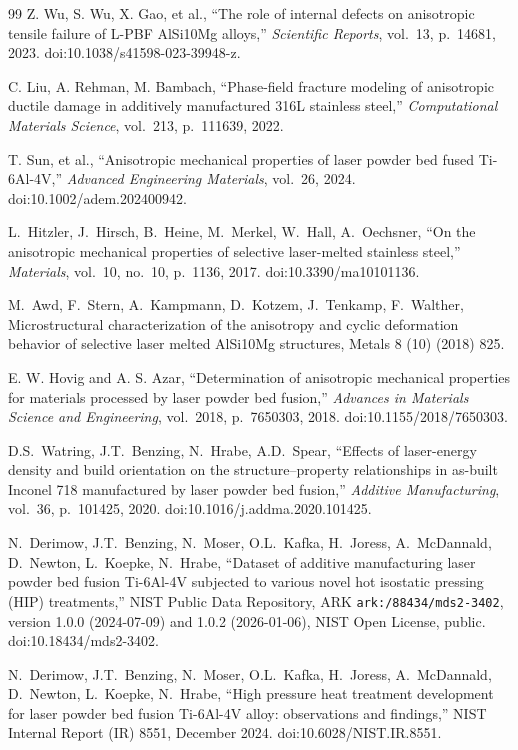 \documentclass[twocolumn]{sagej}
\begin{document}
\begin{thebibliography}{99}
Z. Wu, S. Wu, X. Gao, et al., ``The role of internal defects on anisotropic tensile failure of L-PBF AlSi10Mg alloys,'' \textit{Scientific Reports}, vol.~13, p.~14681, 2023. doi:10.1038/s41598-023-39948-z.

C. Liu, A. Rehman, M. Bambach, ``Phase-field fracture modeling of anisotropic ductile damage in additively manufactured 316L stainless steel,'' \textit{Computational Materials Science}, vol.~213, p.~111639, 2022.

T. Sun, et al., ``Anisotropic mechanical properties of laser powder bed fused Ti-6Al-4V,'' \textit{Advanced Engineering Materials}, vol.~26, 2024. doi:10.1002/adem.202400942.

L.~Hitzler, J.~Hirsch, B.~Heine, M.~Merkel, W.~Hall, A.~Oechsner, ``On the anisotropic mechanical properties of selective laser-melted stainless steel,'' \textit{Materials}, vol.~10, no.~10, p.~1136, 2017. doi:10.3390/ma10101136.

M.~Awd, F.~Stern, A.~Kampmann, D.~Kotzem, J.~Tenkamp, F.~Walther, Microstructural characterization of the anisotropy and cyclic deformation behavior of selective laser melted AlSi10Mg structures, Metals 8 (10) (2018) 825.

E. W. Hovig and A. S. Azar, ``Determination of anisotropic mechanical properties for materials processed by laser powder bed fusion,'' \textit{Advances in Materials Science and Engineering}, vol.~2018, p.~7650303, 2018. doi:10.1155/2018/7650303.

D.S.~Watring, J.T.~Benzing, N.~Hrabe, A.D.~Spear, ``Effects of laser-energy density and build orientation on the structure--property relationships in as-built Inconel 718 manufactured by laser powder bed fusion,'' \textit{Additive Manufacturing}, vol.~36, p.~101425, 2020. doi:10.1016/j.addma.2020.101425.

N.~Derimow, J.T.~Benzing, N.~Moser, O.L.~Kafka, H.~Joress, A.~McDannald, D.~Newton, L.~Koepke, N.~Hrabe, ``Dataset of additive manufacturing laser powder bed fusion Ti-6Al-4V subjected to various novel hot isostatic pressing (HIP) treatments,'' NIST Public Data Repository, ARK \texttt{ark:/88434/mds2-3402}, version 1.0.0 (2024-07-09) and 1.0.2 (2026-01-06), NIST Open License, public. doi:10.18434/mds2-3402.

N.~Derimow, J.T.~Benzing, N.~Moser, O.L.~Kafka, H.~Joress, A.~McDannald, D.~Newton, L.~Koepke, N.~Hrabe, ``High pressure heat treatment development for laser powder bed fusion Ti-6Al-4V alloy: observations and findings,'' NIST Internal Report (IR) 8551, December 2024. doi:10.6028/NIST.IR.8551.


\end{thebibliography}
\end{document}
